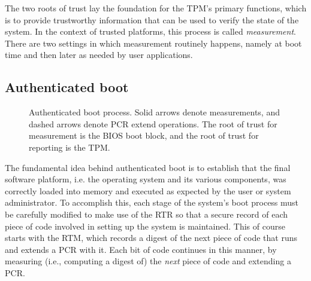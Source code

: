 \documentclass[11pt,twoside]{scrartcl}
\begin{document}
The two roots of trust lay the foundation for the TPM's primary functions, which is to provide trustworthy information that can be used to verify the state of the system. In the context of trusted platforms, this process is called \emph{measurement}. There are two settings in which measurement routinely happens, namely at boot time and then later as needed by user applications.

\subsection{Authenticated boot}

\begin{figure}
\centering

\caption{\label{fig:boot} Authenticated boot process. Solid arrows denote measurements, and dashed arrows denote PCR extend operations. The root of trust for measurement is the BIOS boot block, and the root of trust for reporting is the TPM.}
\end{figure}

The fundamental idea behind authenticated boot is to establish that the final software platform, i.e. the operating system and its various components, was correctly loaded into memory and executed as expected by the user or system administrator. To accomplish this, each stage of the system's boot process must be carefully modified to make use of the RTR so that a secure record of each piece of code involved in setting up the system is maintained. This of course starts with the RTM, which records a digest of the next piece of code that runs and extends a PCR with it. Each bit of code continues in this manner, by measuring (i.e., computing a digest of) the \emph{next} piece of code and extending a PCR.
\end{document}
